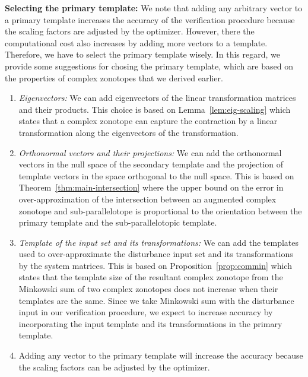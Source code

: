 {\bf Selecting the primary template:  }  We note that adding any
arbitrary vector to a primary template increases the accuracy of the
verification procedure because the scaling factors are adjusted by the
optimizer.  However, there the computational cost also increases by
adding more vectors to a template.  Therefore, we have to select the
primary template wisely.  In this regard, we provide some suggestions
for chosing the primary template, which are based on the properties of
complex zonotopes that we derived earlier.
%
\begin{enumerate}
\item \emph{Eigenvectors:  }  We can add eigenvectors of the linear
transformation matrices and their products.  This choice is based on
Lemma~\ref{lem:eig-scaling} which states that a complex zonotope can
capture the contraction by a linear transformation along the
eigenvectors of the transformation.
\item \emph{Orthonormal vectors and their projections:  }  We can add
the orthonormal vectors in the null space of the secondary template
and the projection of template vectors in the space orthogonal to the
null space.  This is based on Theorem~\ref{thm:main-intersection}
where the upper bound on the error in over-approximation of the intersection
between an augmented complex zonotope and sub-parallelotope is
proportional to the orientation between the primary template and the
sub-parallelotopic template.
\item \emph{Template of the input set and its transformations:  }  We can add the templates
used to over-approximate the disturbance input set and its
transformations by the system matrices.  This is based on
Proposition~\ref{prop:commin} which states that the template size of
the resultant complex zonotope from the Minkowski sum of two complex
zonotopes does not increase when their templates are the same.  Since
we take Minkowski sum with the disturbance input in our verification
procedure, we expect to increase accuracy by incorporating the input
template and its transformations in the primary template.
\item Adding any vector to the primary template will increase the
accuracy because the scaling factors can be adjusted by the
optimizer.
\end{enumerate}
